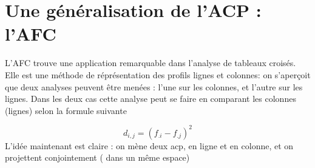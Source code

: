 \documentclass[
]{book}
\newenvironment{Shaded}{\begin{snugshade}}{\end{snugshade}}
\newcommand{\AttributeTok}[1]{\textcolor[rgb]{0.77,0.63,0.00}{#1}}
\newcommand{\ConstantTok}[1]{\textcolor[rgb]{0.00,0.00,0.00}{#1}}
\newcommand{\DecValTok}[1]{\textcolor[rgb]{0.00,0.00,0.81}{#1}}
\newcommand{\FloatTok}[1]{\textcolor[rgb]{0.00,0.00,0.81}{#1}}
\newcommand{\FunctionTok}[1]{\textcolor[rgb]{0.00,0.00,0.00}{#1}}
\newcommand{\NormalTok}[1]{#1}
\newcommand{\OtherTok}[1]{\textcolor[rgb]{0.56,0.35,0.01}{#1}}
\newcommand{\SpecialCharTok}[1]{\textcolor[rgb]{0.00,0.00,0.00}{#1}}
\newcommand{\StringTok}[1]{\textcolor[rgb]{0.31,0.60,0.02}{#1}}
\begin{document}
\hypertarget{une-guxe9nuxe9ralisation-de-lacp-lafc}{%
\section{Une généralisation de l'ACP : l'AFC}\label{une-guxe9nuxe9ralisation-de-lacp-lafc}}

L'AFC trouve une application remarquable dans l'analyse de tableaux croisés. Elle est une méthode de réprésentation des profils lignes et colonnes: on s'aperçoit que deux analyses peuvent être menées : l'une sur les colonnes, et l'autre sur les lignes. Dans les deux cas cette analyse peut se faire en comparant les colonnes (lignes) selon la formule suivante

\[d_{i,j}= (f_{.i}-f_{.j})^2\]
L'idée maintenant est claire : on mène deux acp, en ligne et en colonne, et on projettent conjointement ( dans un même espace)

\begin{Shaded}
\end{Shaded}
\end{document}
